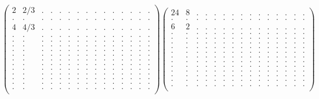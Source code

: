 \documentclass[12pt,a4paper]{amsart}
\begin{document}
\begin{align*}
\left(\begin{array}{rrrrrrrrrrrrrrr}%
2&2/3&.&.&.&.&.&.&.&.&.&.&.&.&.\\%
.&.&.&.&.&.&.&.&.&.&.&.&.&.&.\\%
4&4/3&.&.&.&.&.&.&.&.&.&.&.&.&.\\%
.&.&.&.&.&.&.&.&.&.&.&.&.&.&.\\%
.&.&.&.&.&.&.&.&.&.&.&.&.&.&.\\%
.&.&.&.&.&.&.&.&.&.&.&.&.&.&.\\%
.&.&.&.&.&.&.&.&.&.&.&.&.&.&.\\%
.&.&.&.&.&.&.&.&.&.&.&.&.&.&.\\%
.&.&.&.&.&.&.&.&.&.&.&.&.&.&.\\%
.&.&.&.&.&.&.&.&.&.&.&.&.&.&.\\%
.&.&.&.&.&.&.&.&.&.&.&.&.&.&.\\%
.&.&.&.&.&.&.&.&.&.&.&.&.&.&.\\%
.&.&.&.&.&.&.&.&.&.&.&.&.&.&.\\%
.&.&.&.&.&.&.&.&.&.&.&.&.&.&.\\%
.&.&.&.&.&.&.&.&.&.&.&.&.&.&.\\%
\end{array}\right)%
\left(\begin{array}{rrrrrrrrrrrrrrr}%
24&8&.&.&.&.&.&.&.&.&.&.&.&.&.\\%
.&.&.&.&.&.&.&.&.&.&.&.&.&.&.\\%
6&2&.&.&.&.&.&.&.&.&.&.&.&.&.\\%
.&.&.&.&.&.&.&.&.&.&.&.&.&.&.\\%
.&.&.&.&.&.&.&.&.&.&.&.&.&.&.\\%
.&.&.&.&.&.&.&.&.&.&.&.&.&.&.\\%
.&.&.&.&.&.&.&.&.&.&.&.&.&.&.\\%
.&.&.&.&.&.&.&.&.&.&.&.&.&.&.\\%
.&.&.&.&.&.&.&.&.&.&.&.&.&.&.\\%
.&.&.&.&.&.&.&.&.&.&.&.&.&.&.\\%
.&.&.&.&.&.&.&.&.&.&.&.&.&.&.\\%
.&.&.&.&.&.&.&.&.&.&.&.&.&.&.\\%
.&.&.&.&.&.&.&.&.&.&.&.&.&.&.\\%
.&.&.&.&.&.&.&.&.&.&.&.&.&.&.\\%
.&.&.&.&.&.&.&.&.&.&.&.&.&.&.\\%
\end{array}\right)%
\end{align*}
\end{document}
